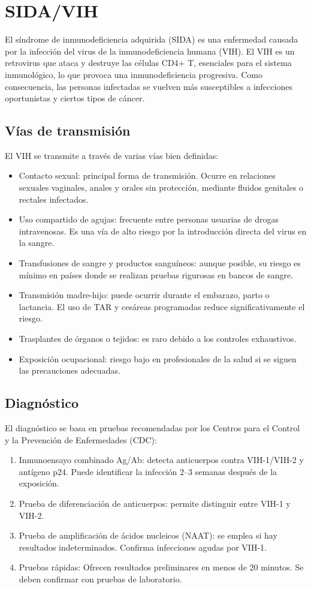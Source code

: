\section{SIDA/VIH}
El síndrome de inmunodeficiencia adquirida (SIDA) es una enfermedad causada por la infección del virus de la inmunodeficiencia humana (VIH). El VIH es un retrovirus que ataca y destruye las células CD4+ T, esenciales para el sistema inmunológico, lo que provoca una inmunodeficiencia progresiva. Como consecuencia, las personas infectadas se vuelven más susceptibles a infecciones oportunistas y ciertos tipos de cáncer. 
\subsection{Vías de transmisión}
El VIH se transmite a través de varias vías bien definidas:
\begin{itemize}
    \item Contacto sexual: principal forma de transmisión. Ocurre en relaciones sexuales vaginales, anales y orales sin protección, mediante fluidos genitales o rectales infectados.
    \item Uso compartido de agujas: frecuente entre personas usuarias de drogas intravenosas. Es una vía de alto riesgo por la introducción directa del virus en la sangre.
    \item Transfusiones de sangre y productos sanguíneos: aunque posible, su riesgo es mínimo en países donde se realizan pruebas rigurosas en bancos de sangre.
    \item Transmisión madre-hijo: puede ocurrir durante el embarazo, parto o lactancia. El uso de TAR y cesáreas programadas reduce significativamente el riesgo.
    \item Trasplantes de órganos o tejidos: es raro debido a los controles exhaustivos.
    \item Exposición ocupacional: riesgo bajo en profesionales de la salud si se siguen las precauciones adecuadas.
\end{itemize}

\subsection{Diagnóstico}
El diagnóstico se basa en pruebas recomendadas por los Centros para el Control y la Prevención de Enfermedades (CDC):
\begin{enumerate}
    \item Inmunoensayo combinado Ag/Ab: detecta anticuerpos contra VIH-1/VIH-2 y antígeno p24. Puede identificar la infección 2–3 semanas después de la exposición.
    \item Prueba de diferenciación de anticuerpos: permite distinguir entre VIH-1 y VIH-2.
    \item Prueba de amplificación de ácidos nucleicos (NAAT): se emplea si hay resultados indeterminados. Confirma infecciones agudas por VIH-1.
    \item Pruebas rápidas: Ofrecen resultados preliminares en menos de 20 minutos. Se deben confirmar con pruebas de laboratorio.
\end{enumerate}


